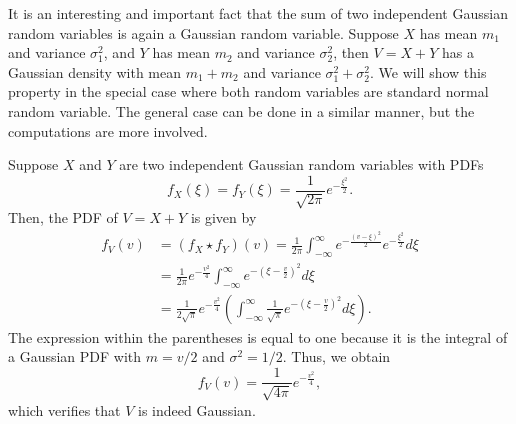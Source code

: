 \begin{example}
It is an interesting and important fact that the sum of two independent Gaussian random variables is again a Gaussian random variable.
Suppose $X$ has mean $m_1$ and variance $\sigma_1^2$, and $Y$ has mean $m_2$ and variance $\sigma_2^2$, then $V = X + Y$ has a Gaussian density with mean $m_1 + m_2$ and variance $\sigma_1^2 + \sigma_2^2$.
We will show this property in the special case where both random variables are standard normal random variable.
The general case can be done in a similar manner, but the computations are more involved.

Suppose $X$ and $Y$ are two independent Gaussian random variables with PDFs
\begin{equation*}
f_X(\xi) = f_Y(\xi) = \frac 1{\sqrt{2\pi}} e^{-\frac{\xi^2}{2}} .
\end{equation*}
Then, the PDF of $V = X + Y$ is given by
\begin{equation*}
\begin{split}
f_V (v) &= (f_X \star f_Y) (v)
= \frac{1}{2\pi}
\int_{-\infty}^{\infty} e^{-\frac{(v - \xi)^2}{2}} e^{-\frac{\xi^2}{2}} d\xi \\
&= \frac{1}{2\pi} e^{- \frac{v^2}{4}}
\int_{-\infty}^{\infty} e^{- \left( \xi - \frac{v}{2} \right)^2} d\xi \\
&= \frac{1}{2 \sqrt{\pi}} e^{- \frac{v^2}{4}}
\left( \int_{-\infty}^{\infty} \frac{1}{\sqrt{\pi}}
e^{-\left( \xi - \frac{v}{2} \right)^2} d\xi \right) .
\end{split}
\end{equation*}
The expression within the parentheses is equal to one because it is the integral of a Gaussian PDF with $m = v/2$ and $\sigma^2 = 1/2$.
Thus, we obtain
\begin{equation*}
f_V(v) = \frac{1}{\sqrt{4\pi}} e^{-\frac{v^2}{4}} ,
\end{equation*}
which verifies that $V$ is indeed Gaussian.
\end{example}

